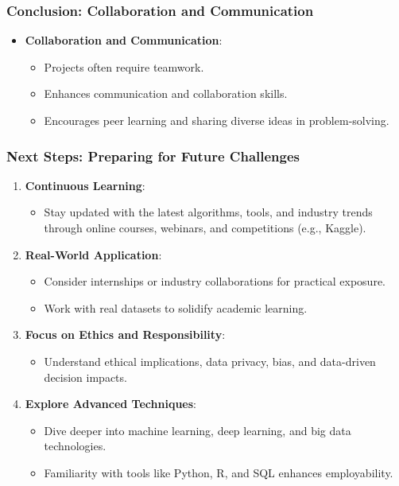 \documentclass[aspectratio=169]{beamer}
\begin{document}
\begin{frame}[fragile]
    \frametitle{Conclusion: Collaboration and Communication}

    \begin{itemize}
        \item \textbf{Collaboration and Communication}:
        \begin{itemize}
            \item Projects often require teamwork.
            \item Enhances communication and collaboration skills.
            \item Encourages peer learning and sharing diverse ideas in problem-solving.
        \end{itemize}
    \end{itemize}
\end{frame}

\begin{frame}[fragile]
    \frametitle{Next Steps: Preparing for Future Challenges}

    \begin{enumerate}
        \item \textbf{Continuous Learning}:
            \begin{itemize}
                \item Stay updated with the latest algorithms, tools, and industry trends through online courses, webinars, and competitions (e.g., Kaggle).
            \end{itemize}
        
        \item \textbf{Real-World Application}:
            \begin{itemize}
                \item Consider internships or industry collaborations for practical exposure.
                \item Work with real datasets to solidify academic learning.
            \end{itemize}
        
        \item \textbf{Focus on Ethics and Responsibility}:
            \begin{itemize}
                \item Understand ethical implications, data privacy, bias, and data-driven decision impacts.
            \end{itemize}
        
        \item \textbf{Explore Advanced Techniques}:
            \begin{itemize}
                \item Dive deeper into machine learning, deep learning, and big data technologies.
                \item Familiarity with tools like Python, R, and SQL enhances employability.
            \end{itemize}
    \end{enumerate}
\end{frame}
\end{document}

